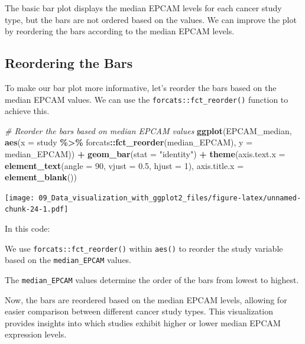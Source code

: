 \documentclass[
]{book}
\newenvironment{Shaded}{\begin{snugshade}}{\end{snugshade}}
\newcommand{\AttributeTok}[1]{\textcolor[rgb]{0.13,0.29,0.53}{#1}}
\newcommand{\CommentTok}[1]{\textcolor[rgb]{0.56,0.35,0.01}{\textit{#1}}}
\newcommand{\DecValTok}[1]{\textcolor[rgb]{0.00,0.00,0.81}{#1}}
\newcommand{\FloatTok}[1]{\textcolor[rgb]{0.00,0.00,0.81}{#1}}
\newcommand{\FunctionTok}[1]{\textcolor[rgb]{0.13,0.29,0.53}{\textbf{#1}}}
\newcommand{\NormalTok}[1]{#1}
\newcommand{\SpecialCharTok}[1]{\textcolor[rgb]{0.81,0.36,0.00}{\textbf{#1}}}
\newcommand{\StringTok}[1]{\textcolor[rgb]{0.31,0.60,0.02}{#1}}
\begin{document}
The basic bar plot displays the median EPCAM levels for each cancer study type, but the bars are not ordered based on the values. We can improve the plot by reordering the bars according to the median EPCAM levels.

\hypertarget{reordering-the-bars}{%
\subsection{Reordering the Bars}\label{reordering-the-bars}}

To make our bar plot more informative, let's reorder the bars based on the median EPCAM values. We can use the \texttt{forcats::fct\_reorder()} function to achieve this.

\begin{Shaded}
\begin{Highlighting}[]
\CommentTok{\# Reorder the bars based on median EPCAM values}
\FunctionTok{ggplot}\NormalTok{(EPCAM\_median, }\FunctionTok{aes}\NormalTok{(}\AttributeTok{x =}\NormalTok{ study }\SpecialCharTok{\%\textgreater{}\%}
\NormalTok{                           forcats}\SpecialCharTok{::}\FunctionTok{fct\_reorder}\NormalTok{(median\_EPCAM), }
                         \AttributeTok{y =}\NormalTok{ median\_EPCAM)) }\SpecialCharTok{+}
  \FunctionTok{geom\_bar}\NormalTok{(}\AttributeTok{stat =} \StringTok{"identity"}\NormalTok{) }\SpecialCharTok{+}
  \FunctionTok{theme}\NormalTok{(}\AttributeTok{axis.text.x =} \FunctionTok{element\_text}\NormalTok{(}\AttributeTok{angle =} \DecValTok{90}\NormalTok{, }\AttributeTok{vjust =} \FloatTok{0.5}\NormalTok{, }\AttributeTok{hjust =} \DecValTok{1}\NormalTok{),}
        \AttributeTok{axis.title.x =} \FunctionTok{element\_blank}\NormalTok{())}
\end{Highlighting}
\end{Shaded}

\texttt{[image: 09\_Data\_visualization\_with\_ggplot2\_files/figure-latex/unnamed-chunk-24-1.pdf]}

In this code:

We use \texttt{forcats::fct\_reorder()} within \texttt{aes()} to reorder the study variable based on the \texttt{median\_EPCAM} values.

The \texttt{median\_EPCAM} values determine the order of the bars from lowest to highest.

Now, the bars are reordered based on the median EPCAM levels, allowing for easier comparison between different cancer study types. This visualization provides insights into which studies exhibit higher or lower median EPCAM expression levels.
\end{document}
